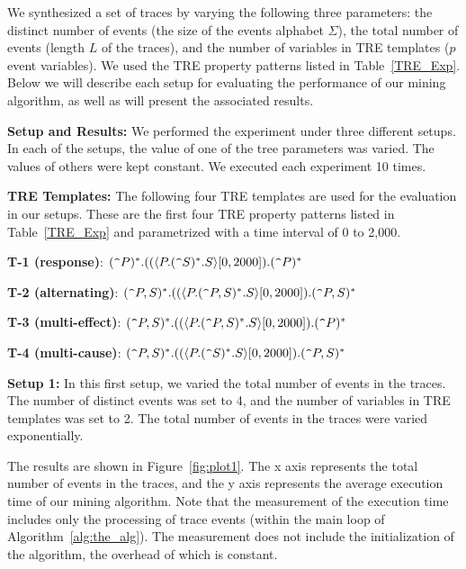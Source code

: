 \documentclass[]{sigplanconf}
\begin{document}
We synthesized a set of traces by varying the following three parameters: the distinct number of events (the size of the events alphabet $\Sigma$), the total number of events (length $L$ of the traces), and the number of variables in TRE templates ($p$ event variables). We used the TRE property patterns listed in Table~\ref{TRE_Exp}.
Below we will describe each setup for evaluating the performance of our mining algorithm, as well as will present the associated results.

\vspace{3mm}

\noindent \textbf{Setup and Results:} We performed the experiment under three different setups. In each of the setups, the value of one of the tree parameters was varied. The values of others were kept constant. We executed each experiment 10 times.

\vspace{3mm}

\noindent \textbf{TRE Templates:} The following four TRE templates are used for the evaluation in our setups. These are the first four TRE property patterns listed in Table~\ref{TRE_Exp} and parametrized with a time interval of 0 to 2,000.
\vspace{2mm}

\noindent \textbf{T-1 (response)}: $(\verb!^!P)^*.((\langle P.(\verb!^!S)^*.S\rangle[0, 2000]).(\verb!^!P)^*$

\noindent \textbf{T-2 (alternating)}: $(\verb!^!P,S)^*.((\langle P.(\verb!^!P,S)^*.S\rangle[0, 2000]).(\verb!^!P,S)^*$

\noindent \textbf{T-3 (multi-effect)}: $(\verb!^!P,S)^*.((\langle P.(\verb!^!P,S)^*.S\rangle[0, 2000]).(\verb!^!P)^*$

\noindent \textbf{T-4 (multi-cause)}: $(\verb!^!P,S)^*.((\langle P.(\verb!^!S)^*.S\rangle[0, 2000]).(\verb!^!P,S)^*$


\vspace{3mm}

\noindent \textbf{Setup 1:}
In this first setup, we varied the total number of events in the traces. The number of distinct events was set to 4, and the number of variables in TRE templates was set to 2. The total number of events in the traces were varied exponentially.

The results are shown in Figure~\ref{fig:plot1}. The x axis represents the total number of events in the traces, and the y axis represents the average execution time of our mining algorithm. Note that the measurement of the execution time includes only the processing of trace events (within the main loop of Algorithm~\ref{alg:the_alg}). The measurement does not include the initialization of the algorithm, the overhead of which is constant.
\end{document}
